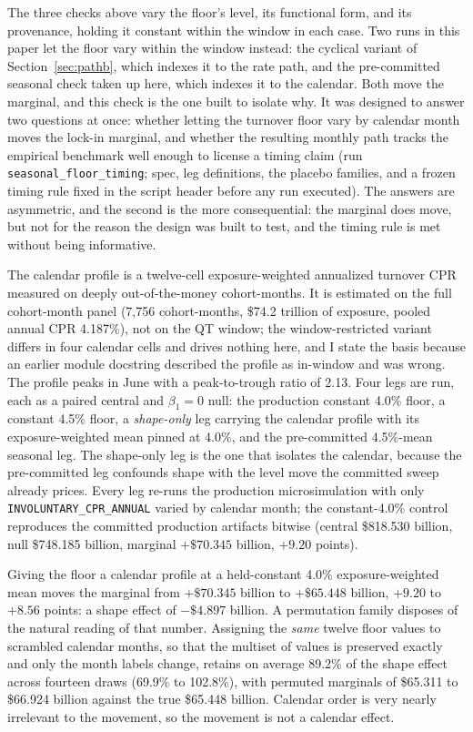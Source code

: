 \documentclass[12pt]{article}
\begin{document}
The three checks above vary the floor's level, its functional form, and its provenance, holding it constant within the window in each case. Two runs in this paper let the floor vary within the window instead: the cyclical variant of Section~\ref{sec:pathb}, which indexes it to the rate path, and the pre-committed seasonal check taken up here, which indexes it to the calendar. Both move the marginal, and this check is the one built to isolate why. It was designed to answer two questions at once: whether letting the turnover floor vary by calendar month moves the lock-in marginal, and whether the resulting monthly path tracks the empirical benchmark well enough to license a timing claim (run \texttt{seasonal\_floor\_timing}; spec, leg definitions, the placebo families, and a frozen timing rule fixed in the script header before any run executed). The answers are asymmetric, and the second is the more consequential: the marginal does move, but not for the reason the design was built to test, and the timing rule is met without being informative.

The calendar profile is a twelve-cell exposure-weighted annualized turnover CPR measured on deeply out-of-the-money cohort-months. It is estimated on the full cohort-month panel (7{,}756 cohort-months, \$74.2 trillion of exposure, pooled annual CPR 4.187\%), not on the QT window; the window-restricted variant differs in four calendar cells and drives nothing here, and I state the basis because an earlier module docstring described the profile as in-window and was wrong. The profile peaks in June with a peak-to-trough ratio of 2.13. Four legs are run, each as a paired central and $\beta_1 = 0$ null: the production constant 4.0\% floor, a constant 4.5\% floor, a \emph{shape-only} leg carrying the calendar profile with its exposure-weighted mean pinned at 4.0\%, and the pre-committed 4.5\%-mean seasonal leg. The shape-only leg is the one that isolates the calendar, because the pre-committed leg confounds shape with the level move the committed sweep already prices. Every leg re-runs the production microsimulation with only \texttt{INVOLUNTARY\_CPR\_ANNUAL} varied by calendar month; the constant-4.0\% control reproduces the committed production artifacts bitwise (central \$818.530 billion, null \$748.185 billion, marginal $+\$70.345$ billion, $+9.20$ points).

Giving the floor a calendar profile at a held-constant 4.0\% exposure-weighted mean moves the marginal from $+\$70.345$ billion to $+\$65.448$ billion, $+9.20$ to $+8.56$ points: a shape effect of $-\$4.897$ billion. A permutation family disposes of the natural reading of that number. Assigning the \emph{same} twelve floor values to scrambled calendar months, so that the multiset of values is preserved exactly and only the month labels change, retains on average 89.2\% of the shape effect across fourteen draws (69.9\% to 102.8\%), with permuted marginals of \$65.311 to \$66.924 billion against the true \$65.448 billion. Calendar order is very nearly irrelevant to the movement, so the movement is not a calendar effect.
\end{document}
